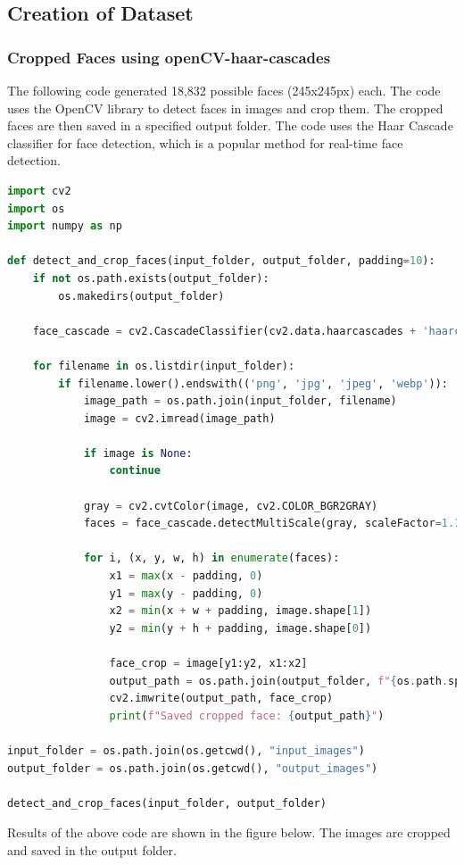 \documentclass[openany]{report}
\begin{document}
\subsection{Creation of Dataset}
\subsubsection{Cropped Faces using openCV-haar-cascades}
The following code generated 18,832 possible faces (245x245px) each. The code uses the OpenCV library to detect faces in images and crop them. The cropped faces are then saved in a specified output folder. The code uses the Haar Cascade classifier for face detection, which is a popular method for real-time face detection. 
\begin{lstlisting}[language=Python]
import cv2
import os
import numpy as np

def detect_and_crop_faces(input_folder, output_folder, padding=10):
    if not os.path.exists(output_folder):
        os.makedirs(output_folder)
    
    face_cascade = cv2.CascadeClassifier(cv2.data.haarcascades + 'haarcascade_frontalface_default.xml')
    
    for filename in os.listdir(input_folder):
        if filename.lower().endswith(('png', 'jpg', 'jpeg', 'webp')):
            image_path = os.path.join(input_folder, filename)
            image = cv2.imread(image_path)
            
            if image is None:
                continue
            
            gray = cv2.cvtColor(image, cv2.COLOR_BGR2GRAY)
            faces = face_cascade.detectMultiScale(gray, scaleFactor=1.1, minNeighbors=5, minSize=(30, 30))
            
            for i, (x, y, w, h) in enumerate(faces):
                x1 = max(x - padding, 0)
                y1 = max(y - padding, 0)
                x2 = min(x + w + padding, image.shape[1])
                y2 = min(y + h + padding, image.shape[0])
                
                face_crop = image[y1:y2, x1:x2]
                output_path = os.path.join(output_folder, f"{os.path.splitext(filename)[0]}_face_{i}.jpg")
                cv2.imwrite(output_path, face_crop)
                print(f"Saved cropped face: {output_path}")

input_folder = os.path.join(os.getcwd(), "input_images")  
output_folder = os.path.join(os.getcwd(), "output_images") 

detect_and_crop_faces(input_folder, output_folder)  
\end{lstlisting}
Results of the above code are shown in the figure below. The images are cropped and saved in the output folder.
\end{document}
